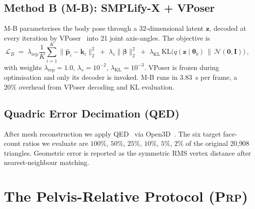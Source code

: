 \documentclass[twocolumn,10pt]{svjour3}
\newcommand{\methodB}{\textsc{M-B}}
\newcommand{\prp}{\textsc{Prp}}
\begin{document}
\subsection{Method B (\methodB{}): SMPLify-X + VPoser}
\methodB{} parameterises the body pose through a $32$-dimensional latent $\mathbf{z}$, decoded at every iteration by VPoser~\cite{VPoser} into 21 joint axis-angles. The objective is
\begin{equation}
\mathcal{L}_B \;=\; \lambda_{\text{rep}}\frac{1}{K}\sum_{i=1}^{K}\|\hat{\mathbf{p}}_i - \mathbf{k}_i\|_2^2 \;+\; \lambda_s\|\boldsymbol{\beta}\|_2^2 \;+\; \lambda_{\text{KL}}\,\mathrm{KL}\!\big(q(\mathbf{z}\mid\boldsymbol{\theta}_b)\,\|\,\mathcal{N}(\mathbf{0},\mathbf{I})\big)\,,
\label{eq:Lb}
\end{equation}
with weights $\lambda_{\text{rep}}=1.0$, $\lambda_s=10^{-2}$, $\lambda_{\text{KL}}=10^{-3}$. VPoser is frozen during optimisation and only its decoder is invoked. \methodB{} runs in $3.83$~s per frame, a $20\%$ overhead from VPoser decoding and KL evaluation.

\subsection{Quadric Error Decimation (QED)}
After mesh reconstruction we apply QED~\cite{QED} via Open3D~\cite{Open3D}. The six target face-count ratios we evaluate are $100\%$, $50\%$, $25\%$, $10\%$, $5\%$, $2\%$ of the original 20{,}908 triangles. Geometric error is reported as the symmetric RMS vertex distance after nearest-neighbour matching.

\section{The Pelvis-Relative Protocol (\prp{})}
\label{sec:protocol}
\end{document}
